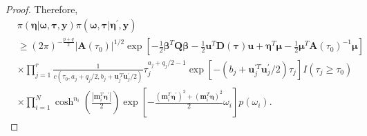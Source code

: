 \documentclass[11pt,a4paper]{article}
\begin{document}
\begin{proof}
Therefore, 
\begin{align*}
& \pi(\bm{\eta}|\bm{\omega},\bm{\tau},\bm{y})\pi(\bm{\omega,\tau}|\bm{\eta}^{\prime},\bm{y})\\
& \geq\left(2\pi\right)^{-\frac{p+q}{2}}\left|\bm{A}\left(\tau_{0}\right)\right|^{1/2}\exp\left[-\frac{1}{2}\bm{\beta}^{T}\bm{Q}\bm{\beta}-\frac{1}{2}\bm{u}^{T}\bm{D}(\bm{\tau})\bm{u}+\bm{\eta}^{T}\bm{\mu}-\frac{1}{2}\bm{\mu}^{T}\bm{A}\left(\tau_{0}\right)^{-1}\bm{\mu}\right]\\
& \times\prod_{j=1}^{r}\frac{1}{c\left(\tau_{0},a_{j} + q_{j}/2, b_j +\bm{u}_{j}^{\prime T}\bm{u}_{j}^{\prime}/2\right)}\tau_{j}^{a_{j}+q_{j}/2-1}\exp\left[-\left(b_{j}+\bm{u}_{j}^{\prime T}\bm{u}_{j}^{\prime}/2\right)\tau_{j}\right]I(\tau_j \geq \tau_0)\\
& \times\prod_{i=1}^{N}\cosh^{n_i}\left(\frac{\left|\bm{m}_{i}^{T}\bm{\eta}^{\prime}\right|}{2}\right)\exp\left[-\frac{\left(\bm{m}_{i}^{T}\bm{\eta}^{\prime}\right)^{2}+\left(\bm{m}_{i}^{T}\bm{\eta}\right)^{2}}{2}\omega_{i}\right]p\left(\omega_{i}\right).
\end{align*}


\end{proof}
\end{document}

